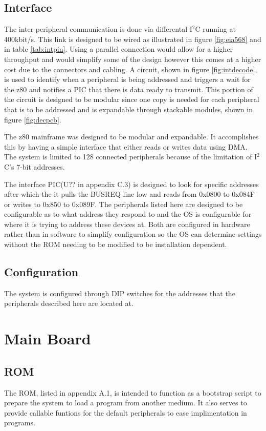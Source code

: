 \documentclass{book}
\begin{document}
\section{Interface}
The inter-peripheral communication is done via differental I$^2$C running at 400kbit/s. This link is designed to be wired as illustrated in figure 
\ref{fig:eia568} and in table \ref{tab:intpin}. Using a parallel connection would allow for a higher throughput and would simplify some of the design 
however this comes at a higher cost due to the connectors and cabling. A circuit, shown in figure \ref{fig:intdecode}, is used to identify when a peripheral 
is being addressed and triggers a wait for the z80 and notifies a PIC that there is data ready to transmit. This portion of the circuit is designed to be 
modular since one copy is needed for each peripheral that is to be addressed and is expandable through stackable modules, shown in figure \ref{fig:decpcb}.

The z80 mainframe was designed to be modular and expandable. It accomplishes this by having a simple interface that either reads  or writes data using DMA. The system is limited to 128 connected peripherals because of the limitation of I$^2$C's 7-bit addresses.

The interface PIC(U?? in appendix C.3) is designed to look for specific addresses after which the it pulls the BUSREQ line low and reads from 0x0800 to 0x084F or writes to 0x850 to 0x089F. The peripherals listed here are designed to be configurable as to what address they respond to and the OS is configurable for where it is trying to address these devices at. Both are configured in hardware rather than in software to simplify configuration so the OS can determine settings without the ROM needing to be modified to be installation dependent.

\section{Configuration}
The system is configured through DIP switches for the addresses that the peripherals described here are located at.

\chapter{Main Board}
\section{ROM}
The ROM, listed in appendix A.1, is intended to function as a bootstrap script to prepare the system to load a program from another medium. It also serves to provide callable funtions for the default peripherals to ease implimentation in programs.
\end{document}
